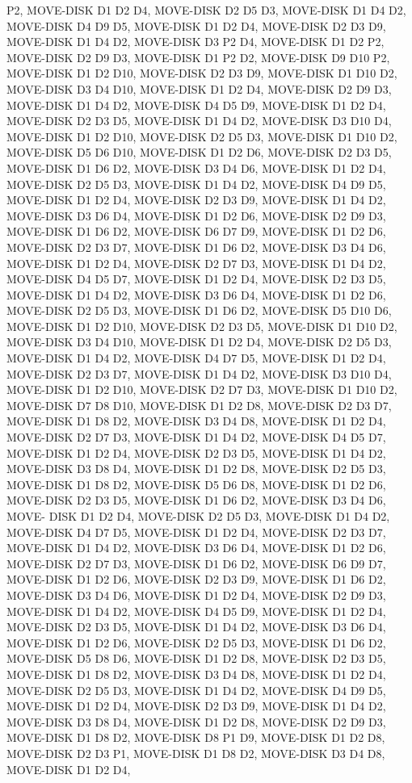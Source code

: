 \documentclass[12pt]{article}
\begin{document}
\begin{appendix}
\begin{itemize}
P2,  MOVE-DISK D1 D2 D4,  MOVE-DISK D2 D5 D3,  MOVE-DISK D1 D4 D2,  MOVE-DISK D4 D9 D5,  MOVE-DISK D1 D2 D4,  MOVE-DISK D2 D3 D9,  MOVE-DISK D1 D4 D2,  MOVE-DISK D3 P2 D4,  MOVE-DISK D1 D2 P2,  MOVE-DISK D2 D9 D3,  MOVE-DISK D1 P2 D2,  MOVE-DISK D9 D10 P2,  MOVE-DISK D1 D2 D10,  MOVE-DISK D2 D3 D9,  MOVE-DISK D1 D10 D2,  MOVE-DISK D3 D4 D10,  MOVE-DISK D1 D2 D4,  MOVE-DISK D2 D9 D3,  MOVE-DISK D1 D4 D2,  MOVE-DISK D4 D5 D9,  MOVE-DISK D1 D2 D4,  MOVE-DISK D2 D3 D5,  MOVE-DISK D1 D4 D2,  MOVE-DISK D3 D10 D4,  MOVE-DISK D1 D2 D10,  MOVE-DISK D2 D5 D3,  MOVE-DISK D1 D10 D2,  MOVE-DISK D5 D6 D10,  MOVE-DISK D1 D2 D6,  MOVE-DISK D2 D3 D5,  MOVE-DISK D1 D6 D2,  MOVE-DISK D3 D4 D6,  MOVE-DISK D1 D2 D4,  MOVE-DISK D2 D5 D3,  MOVE-DISK D1 D4 D2,  MOVE-DISK D4 D9 D5,  MOVE-DISK D1 D2 D4,  MOVE-DISK D2 D3 D9,  MOVE-DISK D1 D4 D2,  MOVE-DISK D3 D6 D4,  MOVE-DISK D1 D2 D6,  MOVE-DISK D2 D9 D3,  MOVE-DISK D1 D6 D2,  MOVE-DISK D6 D7 D9,  MOVE-DISK D1 D2 D6,  MOVE-DISK D2 D3 D7,  MOVE-DISK D1 D6 D2,  MOVE-DISK D3 D4 D6,  
MOVE-DISK D1 D2 D4,  MOVE-DISK D2 D7 D3,  MOVE-DISK D1 D4 D2,  MOVE-DISK D4 D5 D7,  MOVE-DISK D1 D2 D4,  MOVE-DISK D2 D3 D5,  MOVE-DISK D1 D4 D2,  MOVE-DISK D3 D6 D4,  MOVE-DISK D1 D2 D6,  MOVE-DISK D2 D5 D3,  MOVE-DISK D1 D6 D2,  MOVE-DISK D5 D10 D6,  MOVE-DISK D1 D2 D10,  MOVE-DISK D2 D3 D5,  MOVE-DISK D1 D10 D2,  MOVE-DISK D3 D4 D10,  MOVE-DISK D1 D2 D4,  MOVE-DISK D2 D5 D3,  MOVE-DISK D1 D4 D2,  MOVE-DISK D4 D7 D5,  MOVE-DISK D1 D2 D4,  MOVE-DISK D2 D3 D7,  MOVE-DISK D1 D4 D2,  MOVE-DISK D3 D10 D4,  MOVE-DISK D1 D2 D10,  MOVE-DISK D2 D7 D3,  MOVE-DISK D1 D10 D2,  MOVE-DISK D7 D8 D10,  MOVE-DISK D1 D2 D8,  MOVE-DISK D2 D3 D7,  MOVE-DISK D1 D8 D2,  MOVE-DISK D3 D4 D8,  MOVE-DISK D1 D2 D4,  MOVE-DISK D2 D7 D3,  MOVE-DISK D1 D4 D2,  MOVE-DISK D4 D5 D7,  MOVE-DISK D1 D2 D4,  MOVE-DISK D2 D3 D5,  MOVE-DISK D1 D4 D2,  MOVE-DISK D3 D8 D4,  MOVE-DISK D1 D2 D8,  MOVE-DISK D2 D5 D3,  MOVE-DISK D1 D8 D2,  MOVE-DISK D5 D6 D8,  MOVE-DISK D1 D2 D6,  MOVE-DISK D2 D3 D5,  MOVE-DISK D1 D6 D2,  MOVE-DISK D3 D4 D6,  MOVE-
DISK D1 D2 D4,  MOVE-DISK D2 D5 D3,  MOVE-DISK D1 D4 D2,  MOVE-DISK D4 D7 D5,  MOVE-DISK D1 D2 D4,  MOVE-DISK D2 D3 D7,  MOVE-DISK D1 D4 D2,  MOVE-DISK D3 D6 D4,  MOVE-DISK D1 D2 D6,  MOVE-DISK D2 D7 D3,  MOVE-DISK D1 D6 D2,  MOVE-DISK D6 D9 D7,  MOVE-DISK D1 D2 D6,  MOVE-DISK D2 D3 D9,  MOVE-DISK D1 D6 D2,  MOVE-DISK D3 D4 D6,  MOVE-DISK D1 D2 D4,  MOVE-DISK D2 D9 D3,  MOVE-DISK D1 D4 D2,  MOVE-DISK D4 D5 D9,  MOVE-DISK D1 D2 D4,  MOVE-DISK D2 D3 D5,  MOVE-DISK D1 D4 D2,  MOVE-DISK D3 D6 D4,  MOVE-DISK D1 D2 D6,  MOVE-DISK D2 D5 D3,  MOVE-DISK D1 D6 D2,  MOVE-DISK D5 D8 D6,  MOVE-DISK D1 D2 D8,  MOVE-DISK D2 D3 D5,  MOVE-DISK D1 D8 D2,  MOVE-DISK D3 D4 D8,  MOVE-DISK D1 D2 D4,  MOVE-DISK D2 D5 D3,  MOVE-DISK D1 D4 D2,  MOVE-DISK D4 D9 D5,  MOVE-DISK D1 D2 D4,  MOVE-DISK D2 D3 D9,  MOVE-DISK D1 D4 D2,  MOVE-DISK D3 D8 D4,  MOVE-DISK D1 D2 D8,  MOVE-DISK D2 D9 D3,  MOVE-DISK D1 D8 D2,  MOVE-DISK D8 P1 D9,  MOVE-DISK D1 D2 D8,  MOVE-DISK D2 D3 P1,  MOVE-DISK D1 D8 D2,  MOVE-DISK D3 D4 D8,  MOVE-DISK D1 D2 D4,  

\end{itemize}
\end{appendix}
\end{document}
